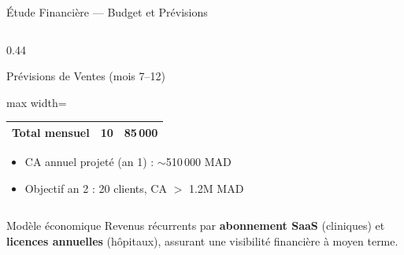 \documentclass{beamer}
\begin{document}
\begin{frame}[t]{Étude Financière --- Budget et Prévisions}
\begin{columns}[T,onlytextwidth]
\begin{column}{0.44\textwidth}
\begin{block}{Prévisions de Ventes (mois 7--12)}
\begin{adjustbox}{max width=\linewidth}
\begin{tabular}{|p{2.6cm}|r|r|}
\textbf{Total mensuel} & \textbf{10} & \textbf{85\,000} \\ \hline
\end{tabular}
\end{adjustbox}
\vspace{0.15cm}
\begin{itemize}
\setlength{\itemsep}{0.12em}
\item CA annuel projeté (an 1) : $\sim$510\,000 MAD
\item Objectif an 2 : 20 clients, CA $>$ 1.2M MAD
\end{itemize}
\end{block}
\end{column}
\end{columns}
\begin{alertblock}{Modèle économique}
Revenus récurrents par \textbf{abonnement SaaS} (cliniques) et \textbf{licences annuelles} (hôpitaux), assurant une visibilité financière à moyen terme.
\end{alertblock}
\end{frame}
\end{document}
